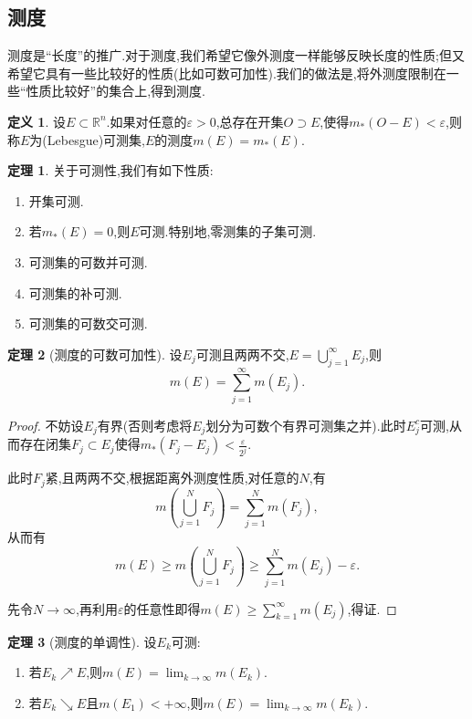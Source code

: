 \documentclass{ctexart}
\theoremstyle{definition}
\newtheorem{definition}{定义}
\newtheorem{theorem}{定理}
\theoremstyle{remark}
\begin{document}
	\subsection{测度}
	测度是``长度''的推广.对于测度,我们希望它像外测度一样能够反映长度的性质;但又希望它具有一些比较好的性质(比如可数可加性).我们的做法是,将外测度限制在一些``性质比较好''的集合上,得到测度.
	
	\begin{definition}
	设$E\subset\mathbb{R}^n$.如果对任意的$\varepsilon>0$,总存在开集$O\supset E$,使得$m_*(O-E)<\varepsilon$,则称$E$为(Lebesgue)可测集,$E$的测度$m(E)=m_*(E)$.
	\end{definition}
	\begin{theorem}
		关于可测性,我们有如下性质:
		\begin{enumerate}
			\item 开集可测.
			\item 若$m_*(E)=0$,则$E$可测.特别地,零测集的子集可测.
			\item 可测集的可数并可测.
			\item 可测集的补可测.
			\item 可测集的可数交可测.
		\end{enumerate}
	\end{theorem}
	
	\begin{theorem}[测度的可数可加性]
		设$E_j$可测且两两不交,$E=\bigcup_{j=1}^\infty{E_j}$,则
		$$m(E)=\sum_{j=1}^\infty{m(E_j)}.$$
	\end{theorem}
	\begin{proof}
		不妨设$E_j$有界(否则考虑将$E_j$划分为可数个有界可测集之并).此时$E_j^c$可测,从而存在闭集$F_j\subset E_j$使得$m_*(F_j-E_j)<\frac{\varepsilon}{2^j}$.
		
		此时$F_j$紧,且两两不交,根据距离外测度性质,对任意的$N$,有
		$$m\left(\bigcup_{j=1}^N{F_j}\right)=\sum_{j=1}^N{m(F_j)},$$
		从而有
		$$m(E)\ge m\left(\bigcup_{j=1}^N{F_j}\right)
			\ge\sum_{j=1}^N{m(E_j)}-\varepsilon.$$
		
		先令$N\to\infty$,再利用$\varepsilon$的任意性即得$m(E)\ge\sum_{k=1}^\infty{m(E_j)}$,得证.
	\end{proof}
	
	\begin{theorem}[测度的单调性]
		设$E_k$可测:
		\begin{enumerate}
			\item 若$E_k\nearrow E$,则$m(E)=\lim_{k\to\infty}{m(E_k)}$.
			\item 若$E_k\searrow E$且$m(E_1)<+\infty$,则$m(E)=\lim_{k\to\infty}{m(E_k)}$.
		\end{enumerate}
	\end{theorem}
	
\end{document}
